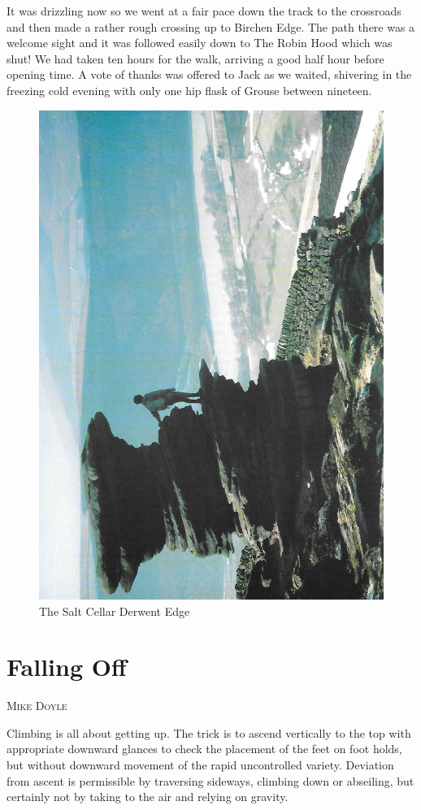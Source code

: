 \documentclass[a5paper,openany,font 10pt]{scrbook}
\makeatletter
\newcommand{\chapterauthor}[1]{%
{\parindent0pt\vspace*{-5pt}%
\linespread{1.1}\large\scshape#1%
\par\nobreak\vspace*{35pt}}
\@afterheading%
}
\makeatother
\begin{document}
It was drizzling now so we went at a fair pace down the
track to the crossroads and then made a rather rough crossing up
to Birchen Edge. The path there was a welcome sight and it was
followed easily down to The Robin Hood   which was shut! We had
taken ten hours for the walk, arriving a good half hour before
opening time. A vote of thanks was offered to Jack as we waited,
shivering in the freezing cold evening with only one hip flask of
Grouse between nineteen.
\begin{figure}[htb]
\centering
\includegraphics[width=.9\linewidth]{./images/The_Salt_Cellar_Derwent_Edge.jpg}
\caption{\label{fig:org14337f6}
The Salt Cellar Derwent Edge}
\end{figure}

\chapter{Falling Off}
\label{sec:orgf9fb0ff}
\chapterauthor{Mike Doyle}

Climbing is all about getting up. The trick is to ascend
vertically to the top with appropriate downward glances to check
the placement of the feet on foot holds, but without downward
movement of the rapid uncontrolled variety. Deviation from ascent
is permissible by traversing sideways, climbing down or
 abseiling, but certainly not by taking to the air and relying on
gravity.
\end{document}
